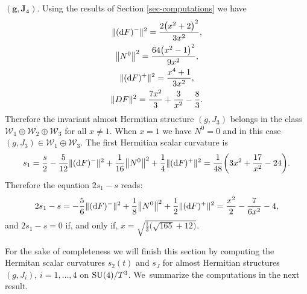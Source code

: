 \documentclass[pdftex]{sigma}%
\numberwithin{equation}{section}
\begin{document}
\medskip\noindent
$\boldsymbol{(g,J_{4}).}$ Using the results of Section \ref{sec-computations} we have
\begin{gather*}
\|({\rm d}F)^{-}\|^{2}=\frac{2 \big(x^2+2\big)^2}{3 x^2},\\
\big\|N^{0}\big\|^{2}=\frac{64 \big(x^2-1\big)^2}{9 x^2}, \\
\|({\rm d}F)^{+}\|^{2}=\frac{x^4+1}{3 x^2}, \\
\|DF\|^{2}=\frac{7 x^2}{3}+\frac{3}{x^2}-\frac{8}{3}.
\end{gather*}
Therefore the invariant almost Hermitian structure $(g,J_3)$ belongs in the class $\mathcal{W}_{1}\oplus \mathcal{W}_{2}\oplus \mathcal{W}_{3}$ for all $x\neq 1$. When $x=1$ we have $N^0=0$ and in this case $(g,J_3)\in \mathcal{W}_{1}\oplus \mathcal{W}_{3} $.
The first Hermitian scalar curvature is
\begin{align*}
s_{1}=\dfrac{s}{2}-\dfrac{5}{12}\|({\rm d}F)^{-}\|^{2}+\dfrac{1}{16}\big\|N^{0}\big\|^{2}+\dfrac{1}{4}\|({\rm d}F)^{+}\|^{2}
=\frac{1}{48} \bigg(3 x^2+\frac{17}{x^2}-24\bigg).
\end{align*}
Therefore the equation $2s_{1}-s$ reads:
\begin{align*}
2s_{1}-s=-\dfrac{5}{6}\|({\rm d}F)^{-}\|^{2}+\dfrac{1}{8}\big\|N^{0}\big\|^{2}+\dfrac{1}{2}\|({\rm d}F)^{+}\|^{2}
=\frac{x^2}{2}-\frac{7}{6 x^2}-4,
\end{align*}
and $2s_{1}-s=0$ if, and only if, $x=\sqrt{\frac{1}{3} \big(\sqrt{165}+12\big)}$.

For the sake of completeness we will finish this section by computing the Hermitan scalar curvatures $s_2(t)$ and $s_J$ for almost Hermitian structures $(g, J_i)$, $i=1,\ldots,4$ on ${\rm SU}(4)/T^3$. We~summarize the computations in the next result.
\end{document}
